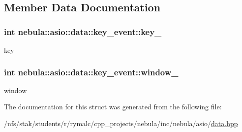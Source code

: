 \subsection{Member Data Documentation}
\hypertarget{structnebula_1_1asio_1_1data_1_1key__event_a174a1956fb32c85119c164909ca35c95}{
\subsubsection[{key\_\-}]{\setlength{\rightskip}{0pt plus 5cm}int {\bf nebula::asio::data::key\_\-event::key\_\-}}}
\label{structnebula_1_1asio_1_1data_1_1key__event_a174a1956fb32c85119c164909ca35c95}
key \hypertarget{structnebula_1_1asio_1_1data_1_1key__event_a1d4f9f8811e4132aee740814fe3a6836}{
\subsubsection[{window\_\-}]{\setlength{\rightskip}{0pt plus 5cm}int {\bf nebula::asio::data::key\_\-event::window\_\-}}}
\label{structnebula_1_1asio_1_1data_1_1key__event_a1d4f9f8811e4132aee740814fe3a6836}
window 

The documentation for this struct was generated from the following file:\begin{DoxyCompactItemize}
\item 
/nfs/stak/students/r/rymalc/cpp\_\-projects/nebula/inc/nebula/asio/\hyperlink{data_8hpp}{data.hpp}\end{DoxyCompactItemize}

